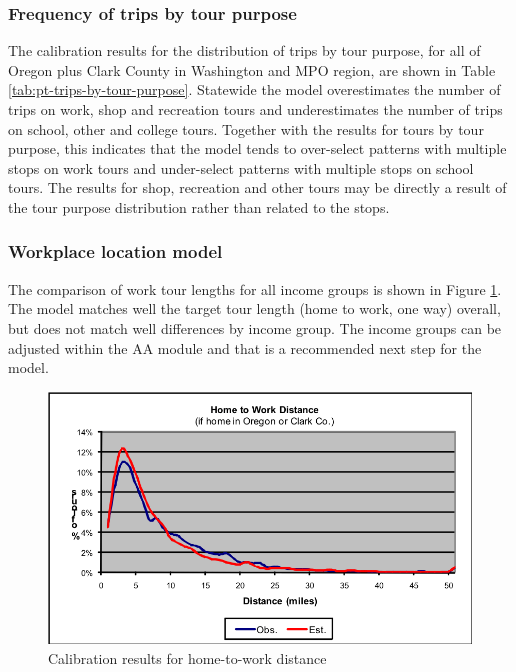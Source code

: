 \subsubsection{Frequency of trips by tour purpose}
The calibration results for the distribution of trips by tour purpose, for all of Oregon plus Clark County in Washington and MPO region, are shown in Table \ref{tab:pt-trips-by-tour-purpose}. Statewide the model overestimates the number of trips on work, shop and recreation tours and underestimates the number of trips on school, other and college tours. Together with the results for tours by tour purpose, this indicates that the model tends to over-select patterns with multiple stops on work tours and under-select patterns with multiple stops on school tours. The results for shop, recreation and other tours may be directly a result of the tour purpose distribution rather than related to the stops.


\subsubsection{Workplace location model}
The comparison of work tour lengths for all income groups is shown in Figure \ref{fig:pt-home-work-distance-calibration}. The model matches well the target tour length (home to work, one way) overall, but does not match well differences by income group. The income groups can be adjusted within the AA module and that is a recommended next step for the model.

\begin{figure}  %
\centering
\includegraphics[width=4.5in]{pt/excel-figures/figure7-12.png}
\caption{Calibration results for home-to-work distance}
\label{fig:pt-home-work-distance-calibration}
\end{figure}

